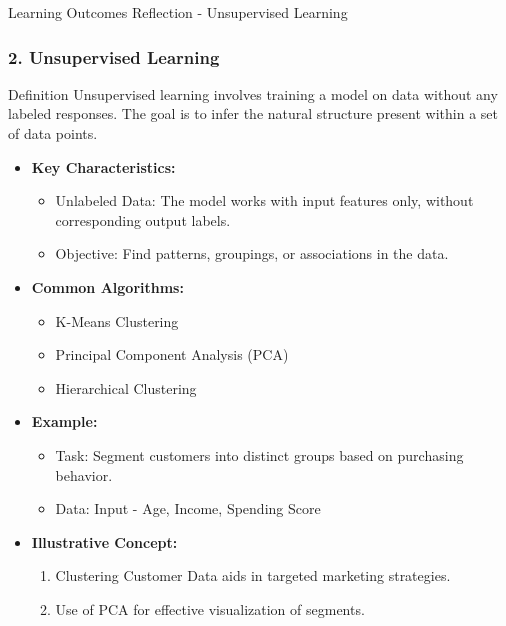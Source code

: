 \documentclass[aspectratio=169]{beamer}
\begin{document}
\begin{frame}[fragile]{Learning Outcomes Reflection - Unsupervised Learning}
    \frametitle{2. Unsupervised Learning}
    \begin{block}{Definition}
        Unsupervised learning involves training a model on data without any labeled responses. The goal is to infer the natural structure present within a set of data points.
    \end{block}

    \begin{itemize}
        \item \textbf{Key Characteristics:}
        \begin{itemize}
            \item Unlabeled Data: The model works with input features only, without corresponding output labels.
            \item Objective: Find patterns, groupings, or associations in the data.
        \end{itemize}

        \item \textbf{Common Algorithms:}
        \begin{itemize}
            \item K-Means Clustering
            \item Principal Component Analysis (PCA)
            \item Hierarchical Clustering
        \end{itemize}

        \item \textbf{Example:}
          \begin{itemize}
            \item Task: Segment customers into distinct groups based on purchasing behavior.
            \item Data: Input - Age, Income, Spending Score
          \end{itemize}
          
        \item \textbf{Illustrative Concept:}
        \begin{enumerate}
            \item Clustering Customer Data aids in targeted marketing strategies.
            \item Use of PCA for effective visualization of segments.
        \end{enumerate}
    \end{itemize}
\end{frame}
\end{document}
